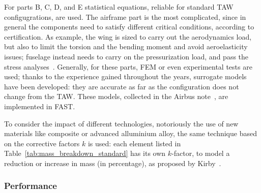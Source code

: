 For parts B, C, D, and E statistical equations, reliable for standard TAW configugrations, are used.
The airframe part is the most complicated, since in general the components need to satisfy different critical conditions, according to certification. 
As example, the wing is sized to carry out the aerodynamics load, but also to limit the torsion and the bending moment and avoid aeroelasticity issues; fuselage instead needs to carry on the pressurization load, and pass the stress analyses~\cite{bib:megson}. 
Generally, for these parts, FEM or even experimental tests are used; thanks to the experience gained throughout the years, surrogate models have been developed: they are accurate as far as the configuration does not change from the TAW. 
These models, collected in the Airbus note~\cite{bib:airbus_notes}, are implemented in FAST. 

To consider the impact of different technologies, notoriously the use of new materials like composite or advanced alluminium alloy, the same technique based on the corrective factors $k$ is used: each element listed in Table~\ref{tab:mass_breakdown_standard} has its own $k$-factor, to model a reduction or increase in mass (in percentage), as proposed by Kirby~\cite{bib:kirby}.

\subsubsection{Performance}
\label{subsubsec:chap2_fast_perfo}

